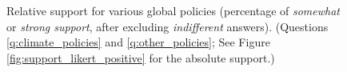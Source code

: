 \begin{figure}
  \caption[Relative support for various global policies]{Relative support for various global policies (percentage of \textit{somewhat} or \textit{strong support}, after excluding \textit{indifferent} answers). (Questions \ref{q:climate_policies} and \ref{q:other_policies}; See Figure \ref{fig:support_likert_positive} for the absolute support.)%
  } %
  \label{fig:support}
\end{figure} 

